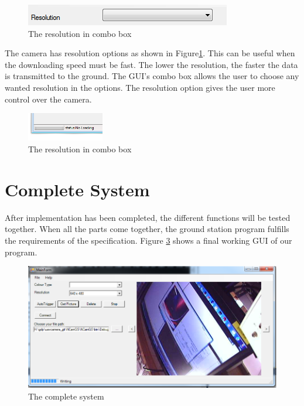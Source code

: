 \begin{figure}[H]
\begin{center}
\includegraphics[scale=0.5]{figures/resolutionOption.png} 
\end{center}
\caption{The resolution in combo box\label{resolutionOption}}
\end{figure}

The camera has resolution options as shown in Figure\ref{resolutionOption}. This can be useful when the downloading speed must be fast. The lower the resolution, the faster the data is transmitted to the ground. The GUI's combo box allows the user to choose any wanted resolution in the options. The resolution option gives the user more control over the camera. 

\begin{figure}[H]
\begin{center}
\includegraphics[width=0.3\textwidth]{figures/progressBar.png} 
\end{center}
\caption{The resolution in combo box\label{progressBar}}
\end{figure}

\section{Complete System}
\label{completeSystem}
After implementation has been completed, the different functions will be tested together. When all the parts come together, the ground station program fulfills the requirements of the specification. Figure \ref{completeSystem} shows a final working GUI of our program. 

\begin{figure}[H]
\begin{center}
\includegraphics[width=1.0\textwidth]{testing_screenshots/ui.png} 
\end{center}
\caption{The complete system\label{completeSystem}}
\end{figure}


